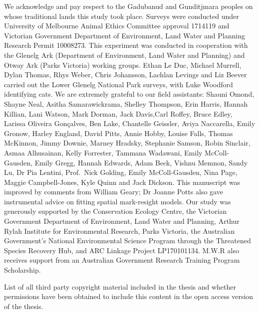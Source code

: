 \documentclass[11pt,a4paper,titlepage,twoside,openright]{style/unimelbthesis}
\begin{document}
\begin{frontmatter}
\begin{acknowledgements}
    We acknowledge and pay respect to the Gadubanud and Gunditjmara peoples on whose traditional lands this study took place. Surveys were conducted under University of Melbourne Animal Ethics Committee approval 1714119 and Victorian Government Department of Environment, Land Water and Planning Research Permit 10008273. This experiment was conducted in cooperation with the Glenelg Ark (Department of Environment, Land Water and Planning) and Otway Ark (Parks Victoria) working groups. Ethan Le Duc, Michael Murrell, Dylan Thomas, Rhys Weber, Chris Johansson, Lachlan Levings and Liz Beever carried out the Lower Glenelg National Park surveys, with Luke Woodford identifying cats. We are extremely grateful to our field assistants: Shauni Omond, Shayne Neal, Asitha Samarawickrama, Shelley Thompson, Erin Harris, Hannah Killian, Lani Watson, Mark Dorman, Jack Davis,Carl Roffey, Bruce Edley, Larissa Oliveira Gonçalves, Ben Lake, Chantelle Geissler, Aviya Naccarella, Emily Gronow, Harley England, David Pitts, Annie Hobby, Louise Falls, Thomas McKinnon, Jimmy Downie, Marney Hradsky, Stephanie Samson, Robin Sinclair, Asmaa Alhusainan, Kelly Forrester, Tammana Wadawani, Emily McColl-Gausden, Emily Gregg, Hannah Edwards, Adam Beck, Vishnu Memnon, Sandy Lu, Dr Pia Lentini, Prof.~Nick Golding, Emily McColl-Gausden, Nina Page, Maggie Campbell-Jones, Kyle Quinn and Jack Dickson. This manuscript was improved by comments from William Geary; Dr Joanne Potts also gave instrumental advice on fitting spatial mark-resight models. Our study was generously supported by the Conservation Ecology Centre, the Victorian Government Department of Environment, Land Water and Planning, Arthur Rylah Institute for Environmental Research, Parks Victoria, the Australian Government's National Environmental Science Program through the Threatened Species Recovery Hub, and ARC Linkage Project LP170101134. M.W.R also receives support from an Australian Government Research Training Program Scholarship.
  \end{acknowledgements}

  \hypersetup{linkcolor=black}
  \setcounter{tocdepth}{2}
  \tableofcontents


  \listoftables


  \listoffigures

\begin{copyrightlist}
  List of all third party copyright material included in the thesis and whether
  permissions have been obtained to include this content in the open access
  version of the thesis.
\end{copyrightlist}
\end{frontmatter}
\end{document}
